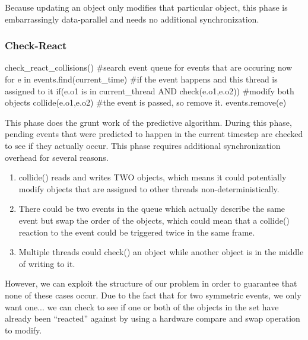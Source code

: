 \documentclass[conference]{IEEEtran}
\begin{document}
Because updating an object only modifies that particular object, this phase is embarrassingly data-parallel and needs no additional synchronization.

\subsubsection{Check-React}

\begin{verbatimtab}[3]
check_react_collisions()
{
   #search event queue for events that are occuring now
   for e in events.find(current_time)
   {
	#if the event happens and this thread is assigned to it
	if(e.o1 is in current_thread AND check(e.o1,e.o2))
	{
		#modify both objects
		collide(e.o1,e.o2)
	}
	#the event is passed, so remove it.
	events.remove(e)
   }
}
\end{verbatimtab}
This phase does the grunt work of the predictive algorithm.  During this phase, pending events that were predicted to happen in the current timestep are checked to see if they actually occur.  This phase requires additional synchronization overhead for several reasons.

\begin{enumerate}
	\item collide() reads and writes TWO objects, which means it could potentially modify objects that are assigned to other threads non-deterministically.
	\item There could be two events in the queue which actually describe the same event but swap the order of the objects, which could mean that a collide() reaction to the event could be triggered twice in the same frame.
	\item Multiple threads could check() an object while another object is in the middle of writing to it.
\end{enumerate}

However, we can exploit the structure of our problem in order to guarantee that none of these cases occur.  Due to the fact that for two symmetric events, we only want one... we can check to see if one or both of the objects in the set have already been ``reacted'' against by using a hardware compare and swap operation to modify.
\end{document}

